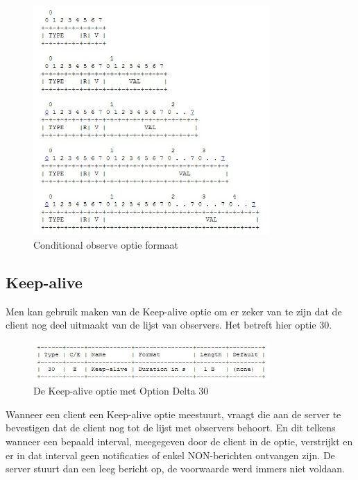 \begin{figure}[h!]
\centering
\includegraphics[width=0.8\textwidth]{fig/conditional_format}
\caption{Conditional observe optie formaat}
\end{figure}

\subsection{Keep-alive}

Men kan gebruik maken van de Keep-alive optie om er zeker van te zijn dat de client nog deel uitmaakt van de lijst van observers. Het betreft hier optie 30.\\

\begin{figure}[h!]
\centering
\includegraphics[width=0.8\textwidth]{fig/keep_alive}
\caption{De Keep-alive optie met Option Delta 30}
\end{figure}

Wanneer een client een Keep-alive optie meestuurt, vraagt die aan de server te bevestigen dat de client nog tot de lijst met observers behoort. En dit telkens wanneer een bepaald interval, meegegeven door de client in de optie, verstrijkt en er in dat interval geen notificaties of enkel NON-berichten ontvangen zijn. De server stuurt dan een leeg bericht op, de voorwaarde werd immers niet voldaan.

